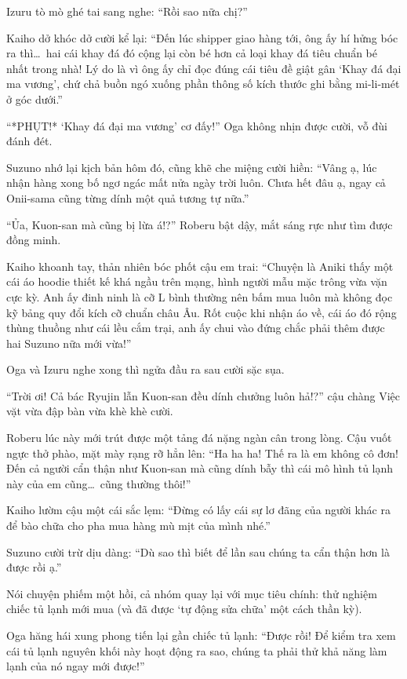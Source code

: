 \documentclass[../main.tex]{subfiles}
\begin{document}
Izuru tò mò ghé tai sang nghe: ``Rồi sao nữa chị?''

Kaiho dở khóc dở cười kể lại: ``Đến lúc shipper giao hàng tới, ông ấy hí hửng bóc ra thì\dots\ hai cái khay đá đó cộng lại còn bé hơn cả loại khay đá tiêu chuẩn bé nhất trong nhà! Lý do là vì ông ấy chỉ đọc đúng cái tiêu đề giật gân `Khay đá đại ma vương', chứ chả buồn ngó xuống phần thông số kích thước ghi bằng mi-li-mét ở góc dưới.''

``*PHỤT!* `Khay đá đại ma vương' cơ đấy!'' Oga không nhịn được cười, vỗ đùi đánh đét.

Suzuno nhớ lại kịch bản hôm đó, cũng khẽ che miệng cười hiền: ``Vâng ạ, lúc nhận hàng xong bố ngơ ngác mất nửa ngày trời luôn. Chưa hết đâu ạ, ngay cả Onii-sama cũng từng dính một quả tương tự nữa.''

``Ủa, Kuon-san mà cũng bị lừa á!?'' Roberu bật dậy, mắt sáng rực như tìm được đồng minh.

Kaiho khoanh tay, thản nhiên bóc phốt cậu em trai: ``Chuyện là Aniki thấy một cái áo hoodie thiết kế khá ngầu trên mạng, hình người mẫu mặc trông vừa vặn cực kỳ. Anh ấy đinh ninh là cỡ L bình thường nên bấm mua luôn mà không đọc kỹ bảng quy đổi kích cỡ chuẩn châu Âu. Rốt cuộc khi nhận áo về, cái áo đó rộng thùng thuồng như cái lều cắm trại, anh ấy chui vào đứng chắc phải thêm được hai Suzuno nữa mới vừa!''

Oga và Izuru nghe xong thì ngửa đầu ra sau cười sặc sụa.

``Trời ơi! Cả bác Ryujin lẫn Kuon-san đều dính chưởng luôn hả!?'' cậu chàng Việc vặt vừa đập bàn vừa khè khè cười.

Roberu lúc này mới trút được một tảng đá nặng ngàn cân trong lòng. Cậu vuốt ngực thở phào, mặt mày rạng rỡ hẳn lên: ``Ha ha ha! Thế ra là em không cô đơn! Đến cả người cẩn thận như Kuon-san mà cũng dính bẫy thì cái mô hình tủ lạnh này của em cũng\dots\ cũng thường thôi!''

Kaiho lườm cậu một cái sắc lẹm: ``Đừng có lấy cái sự lơ đãng của người khác ra để bào chữa cho pha mua hàng mù mịt của mình nhé.''

Suzuno cười trừ dịu dàng: ``Dù sao thì biết để lần sau chúng ta cẩn thận hơn là được rồi ạ.''

\ct

Nói chuyện phiếm một hồi, cả nhóm quay lại với mục tiêu chính: thử nghiệm chiếc tủ lạnh mới mua (và đã được `tự động sửa chữa' một cách thần kỳ).

Oga hăng hái xung phong tiến lại gần chiếc tủ lạnh: ``Được rồi! Để kiểm tra xem cái tủ lạnh nguyên khối này hoạt động ra sao, chúng ta phải thử khả năng làm lạnh của nó ngay mới được!''
\end{document}
